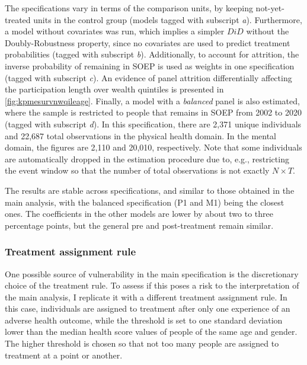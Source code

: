 The specifications vary in terms of the comparison units, by keeping not-yet-treated units in the control group (models tagged with subscript \textit{a}). 
Furthermore, a model without covariates was run, which implies a simpler $DiD$ without the Doubly-Robustness property, since no covariates are used to predict treatment probabilities (tagged with subscript \textit{b}).
Additionally, to account for attrition, the inverse probability of remaining in SOEP is used as weights in one specification  (tagged with subscript \textit{c}). An evidence of panel attrition differentially affecting the participation length over wealth quintiles is presented in \cref{fig:kpmesurvnwqileage}. 
Finally, a model with a \textit{balanced} panel is also estimated, where the sample is restricted to people that remains in SOEP from 2002 to 2020 (tagged with subscript \textit{d}). 
In this specification, there are 2,371 unique individuals and 22,687 total observations in the physical health domain.
In the mental domain, the figures are 2,110 and 20,010, respectively.  
%
Note that some individuals are automatically dropped in the estimation procedure due to, e.g., restricting the event window so that the number of total observations is not exactly $N \times T$.

The results are stable across specifications, and similar to those obtained in the main analysis, with the balanced specification (P1 and  M1) being the closest ones. 
The coefficients in the other models are lower by about two to three percentage points, but the general pre and post-treatment remain similar. 


\subsubsection{Treatment assignment rule}

One possible source of vulnerability in the main specification is the discretionary choice of the treatment
rule. 
To assess if this poses a risk to the interpretation of the main analysis, I replicate it with a different treatment assignment rule. 
In this case, individuals are assigned to treatment after only one experience of an adverse health outcome, while the threshold is set to one standard deviation lower than the median health score values of people of the same age and gender. 
The higher threshold is chosen so that not too many people are assigned to treatment at a point or another.

